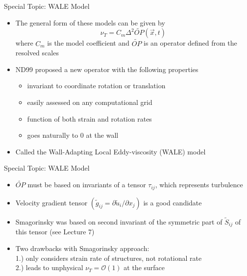 \begin{frame}{Special Topic: WALE Model}
\begin{itemize}
	\item The general form of these models can be given by
	$$\nu_T = C_m \Delta^2 \widetilde{OP}(\vec{x},t)$$
	where $C_m$ is the model coefficient and $\widetilde{OP}$ is an operator defined from the resolved scales
	\item ND99 proposed a new operator with the following properties
	\begin{itemize}
	\item invariant to coordinate rotation or translation
	\item easily assessed on any computational grid
	\item function of both strain and rotation rates
	\item goes naturally to 0 at the wall
	\end{itemize}
	\item Called the Wall-Adapting Local Eddy-viscosity (WALE) model
\end{itemize}
\end{frame}
\begin{frame}{Special Topic: WALE Model}
\begin{itemize}
	\item $\widetilde{OP}$ must be based on invariants of a tensor $\tau_{ij}$, which represents turbulence
	\item Velocity gradient tensor $(\widetilde{g}_{ij} = \partial \widetilde{u}_i / \partial x_j)$ is a good candidate
	\item Smagorinsky was based on second invariant of the symmetric part of $\widetilde{S}_{ij}$ of this tensor (see Lecture 7)
	\item Two drawbacks with Smagorinsky approach: \\1.) only considers strain rate of structures, not rotational rate \\2.) leads to unphysical $\nu_T = \mathcal{O}(1)$ at the surface 
\end{itemize}
\end{frame}

